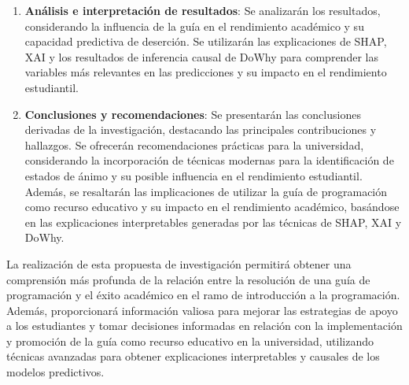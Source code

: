 \begin{enumerate}
    \item \textbf{Análisis e interpretación de resultados}: Se analizarán los resultados, considerando la influencia de la guía en el rendimiento académico y su capacidad predictiva de deserción. Se utilizarán las explicaciones de SHAP, XAI y los resultados de inferencia causal de DoWhy para comprender las variables más relevantes en las predicciones y su impacto en el rendimiento estudiantil.

    \item \textbf{Conclusiones y recomendaciones}: Se presentarán las conclusiones derivadas de la investigación, destacando las principales contribuciones y hallazgos. Se ofrecerán recomendaciones prácticas para la universidad, considerando la incorporación de técnicas modernas para la identificación de estados de ánimo y su posible influencia en el rendimiento estudiantil. Además, se resaltarán las implicaciones de utilizar la guía de programación como recurso educativo y su impacto en el rendimiento académico, basándose en las explicaciones interpretables generadas por las técnicas de SHAP, XAI y DoWhy.

\end{enumerate}

La realización de esta propuesta de investigación permitirá obtener una comprensión más profunda de la relación entre la resolución de una guía de programación y el éxito académico en el ramo de introducción a la programación. Además, proporcionará información valiosa para mejorar las estrategias de apoyo a los estudiantes y tomar decisiones informadas en relación con la implementación y promoción de la guía como recurso educativo en la universidad, utilizando técnicas avanzadas para obtener explicaciones interpretables y causales de los modelos predictivos.
